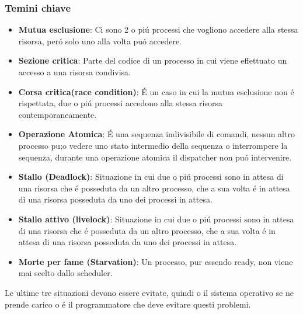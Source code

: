 \subsubsection*{Temini chiave}
\begin{itemize}
    \item \textbf{Mutua esclusione}: Ci sono 2 o piú processi che vogliono accedere alla stessa risorsa, peró solo uno alla volta puó accedere.
    \item \textbf{Sezione critica}: Parte del codice di un processo in cui viene effettuato un accesso a una risorsa condivisa.
    \item \textbf{Corsa critica(race condition)}: É un caso in cui la mutua esclusione non é rispettata, due o piú processi accedono alla stessa risorsa contemporaneamente.
    \item \textbf{Operazione Atomica}: É una sequenza indivisibile di comandi, nessun altro processo pu;o vedere uno stato intermedio della sequenza o interrompere la sequenza, durante una operazione atomica il dispatcher non puó intervenire.
    \item \textbf{Stallo (Deadlock)}: Situazione in cui due o piú processi sono in attesa di una risorsa che é posseduta da un altro processo, che a sua volta é in attesa di una risorsa posseduta da uno dei processi in attesa.
    \item \textbf{Stallo attivo (livelock)}: Situazione in cui due o piú processi sono in attesa di una risorsa che é posseduta da un altro processo, che a sua volta é in attesa di una risorsa posseduta da uno dei processi in attesa.
    \item \textbf{Morte per fame (Starvation)}: Un processo, pur essendo ready, non viene mai scelto dallo scheduler.
\end{itemize}
Le ultime tre situazioni devono essere evitate, quindi o il sistema operativo se ne prende carico o é il programmatore che deve evitare questi problemi.
